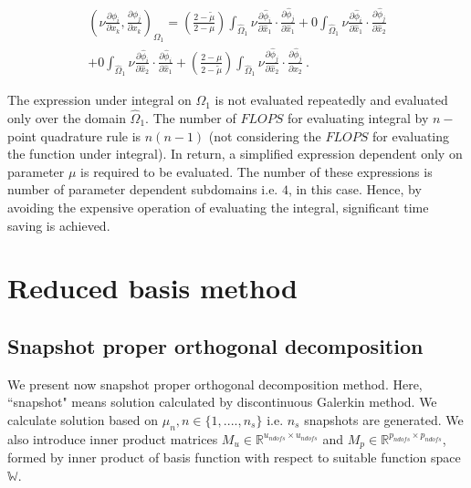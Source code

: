\documentclass[a4paper,oneside,openright,spanish,english]{book}
\begin{document}
\begin{equation}
\begin{split}
(\nu \frac{\partial \phi_i}{\partial x_k} , \frac{\partial \phi_j}{\partial x_k})_{\Omega_1} = \left(\frac{2 - \tilde{\mu}}{2 - \mu} \right) \int_{\hat{\Omega}_1} \nu \frac{\partial \hat{\phi}_i}{\partial \hat{x}_1} \cdot \frac{\partial \hat{\phi}_j}{\partial \hat{x}_1} + 0 \int_{\hat{\Omega}_1} \nu \frac{\partial \hat{\phi}_i}{\partial \hat{x}_1} \cdot \frac{\partial \hat{\phi}_j}{\partial \hat{x}_2} \\ + 0 \int_{\hat{\Omega}_1} \nu \frac{\partial \hat{\phi}_i}{\partial \hat{x}_2} \cdot \frac{\partial \hat{\phi}_i}{\partial \hat{x}_1} + \left( \frac{2 - \mu}{2 - \tilde{\mu}} \right) \int_{\hat{\Omega}_1} \nu \frac{\partial \hat{\phi}_j}{\partial \hat{x}_2} \cdot \frac{\partial \hat{\phi}_j}{\partial \hat{x}_2} \ .
\end{split}
\end{equation}

The expression under integral on $\Omega_1$ is not evaluated repeatedly and evaluated only over the domain $\hat{\Omega}_1$. The number of $FLOPS$ for evaluating integral by $n-$point quadrature rule is $n(n-1)$ (not considering the $FLOPS$ for evaluating the function under integral). In return, a simplified expression dependent only on parameter $\mu$ is required to be evaluated. The number of these expressions is number of parameter dependent subdomains i.e. $4$, in this case. Hence, by avoiding the expensive operation of evaluating the integral, significant time saving is achieved. 

\chapter{Reduced basis method}

\section{Snapshot proper orthogonal decomposition}\label{POD_section}

We present now snapshot proper orthogonal decomposition method. Here, ``snapshot" means solution calculated by discontinuous Galerkin method. We calculate solution based on $\mu_n, n \in \lbrace 1,....,n_s \rbrace$ i.e. $n_s$ snapshots are generated. We also introduce inner product matrices $M_u \in \mathbb{R}^{u_{ndofs} \times u_{ndofs}}$ and $M_p \in \mathbb{R}^{p_{ndofs} \times p_{ndofs}}$, formed by inner product of basis function with respect to suitable function space $\mathbb{W}$.
\end{document}
